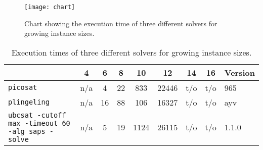 \documentclass[a4paper]{article}
\begin{document}
\begin{figure}[H]
\begin{center}
\texttt{[image: chart]}
\end{center}
\caption{Chart showing the execution time of three different solvers for growing instance sizes.}
\label{chart}
\end{figure}

\begin{table}[H]
\begin{center}
\begin{tabular}{|l|ccccccc|l|}
\hline
          &  4& 6& 8& 10&   12& 14&16&Version\\\hline
\hline
\texttt{picosat}   &n/a& 4&22& 833&22446&t/o&t/o&965\\
\texttt{plingeling}&n/a&16&88& 106&16327&t/o&t/o&ayv\\
\texttt{ubcsat -cutoff max -timeout 60 -alg saps -solve}   &n/a& 5&19&1124&26115&t/o&t/o&1.1.0\\
\hline
\end{tabular}
\end{center}
\caption{Execution times of three different solvers for growing instance sizes.}
\label{charttab}
\end{table}



\end{document}
